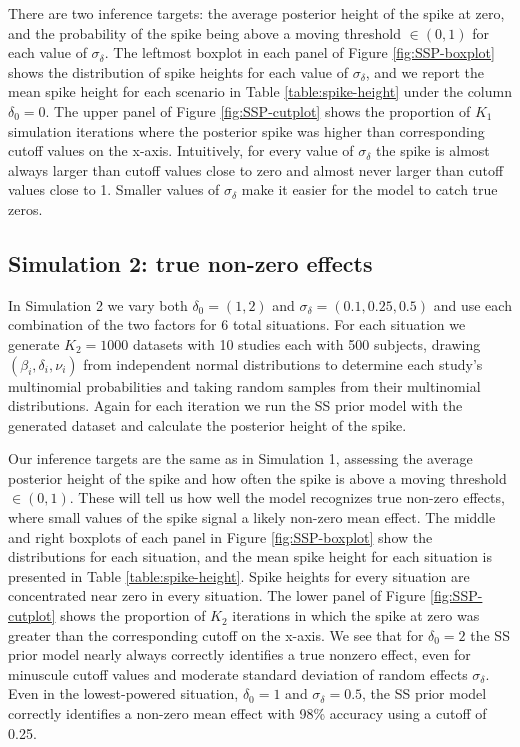 \documentclass[AMA,STIX1COL]{WileyNJD-v2}
\begin{document}
There are two inference targets: the average posterior height of the spike at zero, and the probability of the spike being above a moving threshold $\in (0, 1)$ for each value of $\sigma_\delta$. The leftmost boxplot in each panel of Figure \ref{fig:SSP-boxplot} shows the distribution of spike heights for each value of $\sigma_\delta$, and we report the mean spike height for each scenario in Table \ref{table:spike-height} under the column $\delta_0 = 0$. The upper panel of Figure \ref{fig:SSP-cutplot} shows the proportion of $K_1$ simulation iterations where the posterior spike was higher than corresponding cutoff values on the x-axis. Intuitively, for every value of $\sigma_\delta$ the spike is almost always larger than cutoff values close to zero and almost never larger than cutoff values close to 1. Smaller values of $\sigma_\delta$ make it easier for the model to catch true zeros. 

\subsection{Simulation 2: true non-zero effects} \label{sec:sim_nonzero}

In Simulation 2 we vary both $\delta_0 = (1, 2)$ and $\sigma_\delta = (0.1, 0.25, 0.5)$ and use each combination of the two factors for 6 total situations. For each situation we generate $K_2 = 1000$ datasets with 10 studies each with 500 subjects, drawing $(\beta_i, \delta_i, \nu_i)$ from independent normal distributions to determine each study's multinomial probabilities and taking random samples from their multinomial distributions. Again for each iteration we run the SS prior model with the generated dataset and calculate the posterior height of the spike. 

Our inference targets are the same as in Simulation 1, assessing the average posterior height of the spike and how often the spike is above a moving threshold $\in (0, 1)$. These will tell us how well the model recognizes true non-zero effects, where small values of the spike signal a likely non-zero mean effect. The middle and right boxplots of each panel in Figure \ref{fig:SSP-boxplot} show the distributions for each situation, and the mean spike height for each situation is presented in Table \ref{table:spike-height}. Spike heights for every situation are concentrated near zero in every situation. The lower panel of Figure \ref{fig:SSP-cutplot} shows the proportion of $K_2$ iterations in which the spike at zero was greater than the corresponding cutoff on the x-axis. We see that for $\delta_0 = 2$ the SS prior model nearly always correctly identifies a true nonzero effect, even for minuscule cutoff values and moderate standard deviation of random effects $\sigma_\delta$. Even in the lowest-powered situation, $\delta_0 = 1$ and $\sigma_\delta = 0.5$, the SS prior model correctly identifies a non-zero mean effect with 98\% accuracy using a cutoff of 0.25. 
\end{document}
